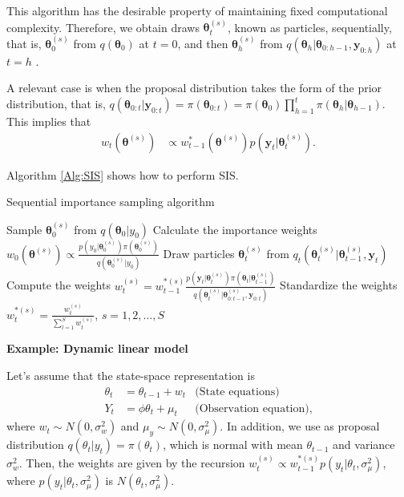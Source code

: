 This algorithm has the desirable property of maintaining fixed computational complexity. Therefore, we obtain draws $\bm{\theta}_t^{(s)}$, known as particles, sequentially, that is, $\bm{\theta}_0^{(s)}$ from $q(\bm{\theta}_0)$ at $t=0$, and then $\bm{\theta}_h^{(s)}$ from $q(\bm{\theta}_h|\bm{\theta}_{0:h-1},\bm{y}_{0:h})$ at $t=h$ \cite{doucet2001introduction,cappe2007overview}.

A relevant case is when the proposal distribution takes the form of the prior distribution, that is, $q(\bm{\theta}_{0:t}|\bm{y}_{0:t}) = \pi(\bm{\theta}_{0:t}) = \pi(\bm{\theta}_0)\prod_{h=1}^{t}\pi(\bm{\theta}_h|\bm{\theta}_{h-1})$. This implies that
\begin{align*}
	w_{t}(\bm{\theta}^{(s)})&\propto w_{t-1}^*(\bm{\theta}^{(s)})p(\bm{y}_{t}|\bm{\theta}_{t}^{(s)}).
\end{align*} 

Algorithm \ref{Alg:SIS} shows how to perform SIS.\\
\begin{algorithm}[h!]
	\caption{Sequential importance sampling algorithm}\label{Alg:SIS}
	\begin{algorithmic}[1]
		\State Sample $\bm{\theta}_0^{(s)}$ from $q(\bm{\theta}_0|y_0)$
		\State Calculate the importance weights $w_0(\bm{\theta}^{(s)})\propto\frac{p(y_0|\bm{\theta}_0^{(s)})\pi(\bm{\theta}_0^{(s)})}{q(\bm{\theta}_0^{(s)}|y_0)}$ 
		\EndFor 
				\State Draw particles $\bm{\theta}_t^{(s)}$ from $q_t(\bm{\theta}_t^{(s)}|\bm{\theta}_{t-1}^{(s)}, \bm{y}_t)$
				\State Compute the weights $w_t^{(s)}=w_{t-1}^{*(s)}\frac{p(\bm{y}_{t}|\bm{\theta}_{t}^{(s)})\pi(\bm{\theta}_{t}|\bm{\theta}_{t-1}^{(s)})}{q(\bm{\theta}_t^{(s)}|\bm{\theta}_{0:t-1}^{(s)},\bm{y}_{0:t})}$
			\EndFor
			\State Standardize the weights $w_t^{*(s)}=\frac{w_t^{(s)}}{\sum_{l=1}^Sw_t^{(s)}}$, $s=1,2,\dots,S$  
		\EndFor
	\end{algorithmic} 
\end{algorithm}

\textbf{Example: Dynamic linear model}

Let's assume that the state-space representation is
\begin{align*}
	{\theta}_t &= {\theta}_{t-1} + {w}_t & \text{(State equations)}\nonumber\\
	Y_t & = \phi {\theta}_t + \mu_t& \text{(Observation equation)},
\end{align*}
where ${w}_t\sim N(0, \sigma_w^2)$ and $\mu_y\sim N(0,\sigma^2_{\mu})$. In addition, we use as proposal distribution $q(\theta_t|y_t)=\pi(\theta_t)$, which is normal with mean $\theta_{t-1}$ and variance $\sigma_w^2$. Then, the weights are given by the recursion $w_t^{(s)}\propto w_{t-1}^{*(s)}p(y_t|\theta_t,\sigma_{\mu}^2)$, where $p(y_t|\theta_t,\sigma_{\mu}^2)$ is $N(\theta_t,\sigma_{\mu}^2)$.

